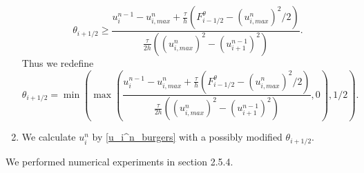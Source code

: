 \documentclass[../include.tex]{subfiles}
\begin{document}
\begin{enumerate}
\begin{equation}
			\theta_{i+1/2} \geq \frac{u_i^{n-1} - u_{i,max}^n + \frac{\tau}{h}(F^{\theta}_{i-1/2} - (u_{i,max}^n)^2/2)}{\frac{\tau}{2h}((u_{i,max}^n)^2 - (u_{i+1}^{n-1})^2)}.
	\end{equation}
	Thus we redefine
	\begin{equation}
		\theta_{i+1/2} = \min \left(\max\left(\frac{u_i^{n-1} - u_{i,max}^n + \frac{\tau}{h}(F^{\theta}_{i-1/2} - (u_{i,max}^n)^2/2)}{\frac{\tau}{2h}((u_{i,max}^n)^2 - (u_{i+1}^{n-1})^2)},0\right),1/2\right).
	\end{equation}
	\item We calculate $ u_i^n $ by \eqref{u_i^n_burgers} with a possibly modified $ \theta_{i+1/2} $.
\end{enumerate}

We performed numerical experiments in section 2.5.4.
\end{document}
